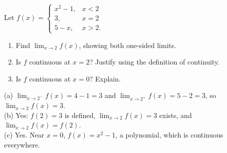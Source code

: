 \begin{exo}{}
Let $f(x)=\begin{cases}x^2-1, & x<2\\ 3, & x=2\\ 5-x, & x>2.\end{cases}$
\begin{enumerate}[label=(\alph*)]
\item Find $\displaystyle\lim_{x\to2}f(x)$, showing both one-sided limits.
\item Is $f$ continuous at $x=2$? Justify using the definition of continuity.
\item Is $f$ continuous at $x=0$? Explain.
\end{enumerate}
\begin{solution}
(a) $\lim_{x\to2^-}f(x)=4-1=3$ and $\lim_{x\to2^+}f(x)=5-2=3$, so $\lim_{x\to2}f(x)=3$.\\
(b) Yes: $f(2)=3$ is defined, $\lim_{x\to2}f(x)=3$ exists, and $\lim_{x\to2}f(x)=f(2)$.\\
(c) Yes. Near $x=0$, $f(x)=x^2-1$, a polynomial, which is continuous everywhere.
\end{solution}
\end{exo}


